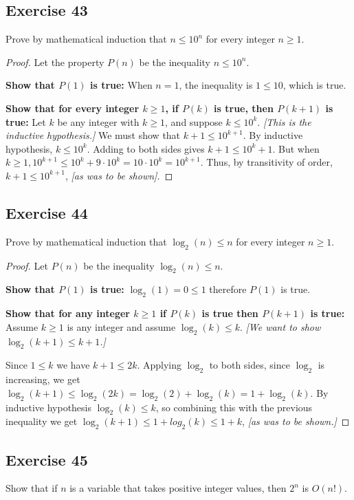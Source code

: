 \documentclass[14pt]{extarticle}
\begin{document}
\subsection{Exercise 43}
Prove by mathematical induction that \(n \leq 10^n\) for every integer \(n \geq 1\).

\begin{proof}
Let the property \(P(n)\) be the inequality \(n \leq 10^n\).

{\bf Show that \(P(1)\) is true:} When \(n = 1\), the inequality is \(1 \leq 10\), which is true. 

{\bf Show that for every integer \(k \geq 1\), if \(P(k)\) is true, then \(P(k + 1)\) is true:} Let \(k\) be any integer 
with \(k \geq 1\), and suppose \(k \leq 10^k\). {\it [This is the inductive hypothesis.]} We must show that \(k + 1 \leq 
10^{k+1}\). By inductive hypothesis, \(k \leq 10^k\). Adding to both sides gives \(k + 1 \leq 10^k + 1\). But when 
\(k \geq 1, 10^{k + 1} \leq 10^k + 9 \cdot 10^k = 10 \cdot 10^k = 10^{k+1}\). Thus, by transitivity of order, \(k + 1 
\leq 10^{k+1}\), {\it [as was to be shown].}
\end{proof}

\subsection{Exercise 44}
Prove by mathematical induction that \(\log_2(n) \leq n\) for every integer \(n \geq 1\).

\begin{proof}
Let \(P(n)\) be the inequality \(\log_2(n) \leq n\).

{\bf Show that \(P(1)\) is true:} \(\log_2(1) = 0 \leq 1\) therefore \(P(1)\) is true.

{\bf Show that for any integer \(k \geq 1\) if \(P(k)\) is true then \(P(k+1)\) is true:} Assume \(k \geq 1\) is any
integer and assume \(\log_2(k) \leq k\). {\it [We want to show \(\log_2(k+1) \leq k+1\).]}

Since \(1 \leq k\) we have \(k+1 \leq 2k\). Applying \(\log_2\) to both sides, since \(\log_2\) is increasing, we 
get \(\log_2(k+1) \leq \log_2(2k) = \log_2(2) + \log_2(k) = 1 + \log_2(k)\). By inductive hypothesis \(\log_2(k) \leq k\),
so combining this with the previous inequality we get \(\log_2(k+1) \leq 1 + log_2(k) \leq 1+k\), 
{\it [as was to be shown.]}
\end{proof}

\subsection{Exercise 45}
Show that if \(n\) is a variable that takes positive integer values, then \(2^n\) is \(O(n!)\).
\end{document}
